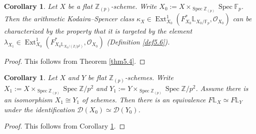 \documentclass[11pt, a4paper]{amsart}
\theoremstyle{plain}
\newtheorem{coro}[theorem]{Corollary}
\theoremstyle{definition}
\begin{document}
\begin{coro}\label{cor5.7}
    Let $X$ be a flat $\mathbb Z_{(p)}$-scheme. Write $X_0:=X\times_{\operatorname{Spec}\mathbb Z_{(p)}}\operatorname{Spec}\mathbb F_p$. Then the arithmetic Kodaira--Spencer class $\kappa_X\in \operatorname{Ext}^1_{X_0}(F^*_{X_0}\mathbb L_{X_0/\mathbb F_p},\mathcal O_{X_0})$ can be characterized by the property that it is targeted by the element $\lambda_{X_1}\in \operatorname{Ext}_{X_0}^1(F^*_{X_0\mathbb L_{X_0/(\mathbb Z/p^2)}},\mathcal O_{X_0})$ (Definition \ref{def5.6}). 
\end{coro}
\begin{proof}
    This follows from Theorem \ref{thm5.4}.
\end{proof}
\begin{coro}\label{cor5.8}
    Let $X$ and $Y$ be flat $\mathbb Z_{(p)}$-schemes. Write $X_1:=X\times _{\operatorname{Spec}\mathbb Z_{(p)}}\operatorname{Spec}\mathbb Z/p^2$ and $Y_1:=Y\times _{\operatorname{Spec}\mathbb Z_{(p)}}\operatorname{Spec}\mathbb Z/p^2$. Assume there is an isomorphism $X_1\cong Y_1$ of schemes. Then there is an equivalence $F\mathbb L_X\simeq F\mathbb L_Y$ under the identification $\mathcal D(X_0)\simeq \mathcal D(Y_0)$.
\end{coro}
\begin{proof}
    This follows from Corollary \ref{cor5.7}.
\end{proof}
\end{document}
